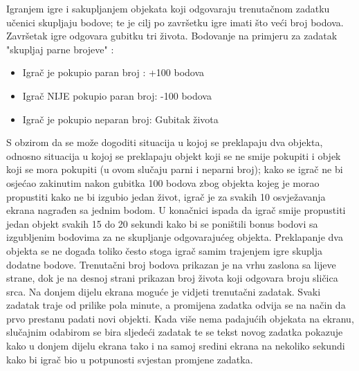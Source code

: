 \documentclass[times, utf8, zavrsni]{fer}
\begin{document}
		Igranjem igre i sakupljanjem objekata koji odgovaraju trenutačnom zadatku učenici skupljaju bodove; te je cilj po završetku igre imati što veći broj bodova. Završetak igre odgovara gubitku tri života.
		Bodovanje na primjeru  za zadatak "skupljaj parne brojeve" :
		\begin{itemize}
				\item  {Igrač je pokupio paran broj : +100 bodova}
				\item  {Igrač NIJE pokupio paran broj: -100 bodova}
				\item  {Igrač je pokupio neparan broj: Gubitak života}
		\end{itemize}
		
		S obzirom da se može dogoditi situacija u kojoj se preklapaju dva objekta, odnosno situacija u kojoj se preklapaju objekt koji se ne smije pokupiti i objek koji se mora pokupiti (u ovom slučaju parni i neparni broj); kako se igrač ne bi osjećao
		zakinutim nakon gubitka 100 bodova zbog objekta kojeg je morao propustiti kako ne bi izgubio jedan život, igrač je za svakih 10 osvježavanja ekrana nagrađen sa jednim bodom. U konačnici ispada da igrač smije propustiti jedan objekt svakih 15 do 20 sekundi
		kako bi se poništili bonus bodovi sa izgubljenim bodovima za ne skupljanje odgovarajućeg objekta. Preklapanje dva objekta se ne događa toliko često stoga igrač samim trajenjem igre skuplja dodatne bodove.
		\newline
		Trenutačni broj bodova prikazan je na vrhu zaslona sa lijeve strane, dok je na desnoj strani prikazan broj života koji odgovara broju sličica srca. Na donjem dijelu ekrana moguće je vidjeti trenutačni zadatak.
		Svaki zadatak traje od prilike pola minute, a promijena zadatka odvija se na način da prvo prestanu padati novi objekti. Kada više nema padajućih objekata na ekranu, slučajnim odabirom se bira sljedeći zadatak te se tekst novog zadatka
		pokazuje kako u donjem dijelu ekrana tako i na samoj sredini ekrana na nekoliko sekundi kako bi igrač bio u potpunosti svjestan promjene zadatka. 

		
\end{document}
